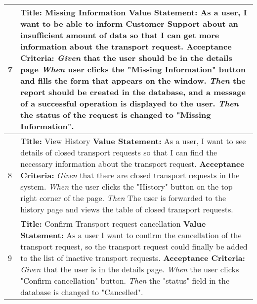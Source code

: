 \documentclass[a4paper]{article}
\begin{document}
\begin{longtable}[c]{|p{0.5cm}||p{}|}
             \hline
               7 & 
                 \textbf{Title:} Missing Information \newline
                 \textbf{Value Statement:}   As a user, I want to be able to inform Customer Support about an insufficient amount of data so that I can get more information about the transport request.
                 \newline
                 \textbf{Acceptance Criteria:} \newline
                 \emph{Given} that the user should be in the details page \newline 
                 \emph{When} user clicks the "Missing Information" button and fills the form that appears on the window. \newline
                 \emph{Then} the report should be created in the database, and a message of a successful operation is displayed to the user.
                  \emph{Then} the status of the request is changed to "Missing Information".
                \\            
             \hline
              8 & 
                 \textbf{Title:} View History   \newline
                 \textbf{Value Statement:}  As a user, I want to see details of closed transport requests so that I can find the necessary information about the transport request. \newline
                \textbf{Acceptance Criteria:} \newline
                 \emph{Given} that there are closed transport requests in the system.\newline 
                 \emph{When} the user clicks the "History" button on the top right corner of the page.\newline
                 \emph{Then} The user is forwarded to the history page and views the table of closed transport requests.
                \\
                \hline
             9 & 
                 \textbf{Title:}  Confirm Transport request cancellation   \newline
                 \textbf{Value Statement:}  As a user I want to confirm the cancellation of the transport request, so the transport request could finally be added to the list of inactive transport requests. \newline
                \textbf{Acceptance Criteria:} \newline
                 \emph{Given} that the user is in the details page.\newline 
                 \emph{When} the user clicks "Confirm cancellation" button.\newline
                 \emph{Then} the "status" field in the database is changed to "Cancelled".                \\
                 
            \hline
            
   
        \end{longtable}
        
\end{document}
